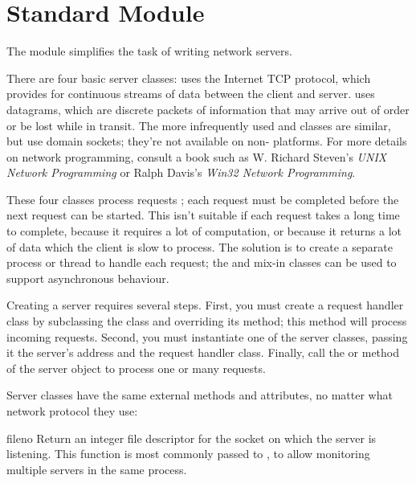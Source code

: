 \section{Standard Module }
\label{module-SocketServer}

The  module simplifies the task of writing network
servers.

There are four basic server classes:  uses the
Internet TCP protocol, which provides for continuous streams of data
between the client and server.   uses datagrams, which
are discrete packets of information that may arrive out of order or be
lost while in transit.  The more infrequently used
 and  classes are
similar, but use \UNIX{} domain sockets; they're not available on
non-\UNIX{} platforms.  For more details on network programming, consult
a book such as W. Richard Steven's \emph{UNIX Network Programming}
or Ralph Davis's \emph{Win32 Network Programming}.

These four classes process requests ; each request
must be completed before the next request can be started.  This isn't
suitable if each request takes a long time to complete, because it
requires a lot of computation, or because it returns a lot of data
which the client is slow to process.  The solution is to create a
separate process or thread to handle each request; the
 and  mix-in classes can be
used to support asynchronous behaviour.

Creating a server requires several steps.  First, you must create a
request handler class by subclassing the 
class and overriding its  method; this method will
process incoming requests.  Second, you must instantiate one of the
server classes, passing it the server's address and the request
handler class.  Finally, call the  or
 method of the server object to process one or
many requests.

Server classes have the same external methods and attributes, no
matter what network protocol they use:

\renewcommand{\indexsubitem}{(SocketServer protocol)}


\begin{funcdesc}{fileno}{}
Return an integer file descriptor for the socket on which the server
is listening.  This function is most commonly passed to
, to allow monitoring multiple servers in the
same process.
\end{funcdesc}

